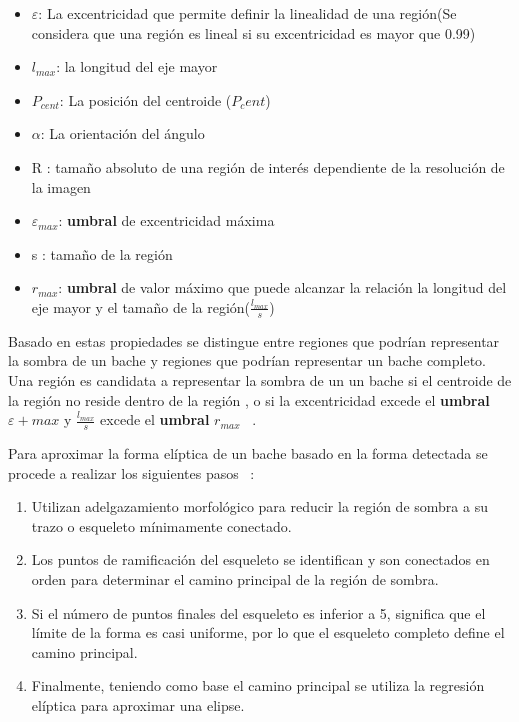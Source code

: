 	\begin{itemize}
		\item $\varepsilon$: La excentricidad que permite definir la linealidad de una región(Se considera que una región es lineal si su excentricidad
			es mayor que 0.99)
		\item $l_{max}$: la longitud del eje mayor 
		\item $P_{cent}$: La posición del centroide ($P_cent$)
		\item $\alpha$: La orientación del ángulo
		\item R : tamaño absoluto de una región de interés dependiente de la resolución de la imagen
		\item $\varepsilon_{max}$: \textbf{umbral} de excentricidad máxima
		\item s : tamaño de la región
		\item $r_{max}$: \textbf{umbral} de valor máximo que puede alcanzar la relación la longitud del eje mayor y el tamaño de la región($\frac{l_{max}
			}{s}$) \end{itemize} 

	Basado en estas propiedades se distingue entre regiones que podrían representar la sombra de un bache y regiones que podrían representar un bache
	completo. Una región es candidata a representar la sombra de un un bache si el centroide de la región no reside dentro de la región , o si la
	excentricidad excede el \textbf{umbral} $\varepsilon+{max}$ y $\frac{l_{max}}{s}$ excede el \textbf{umbral} $r_{max}$ ~.



	Para aproximar la forma elíptica de un bache basado en la forma detectada se procede a realizar los siguientes pasos ~:

	\begin{enumerate}
		\item Utilizan adelgazamiento morfológico para reducir la región de sombra  a su trazo o esqueleto mínimamente conectado.
		\item Los puntos de ramificación del esqueleto se identifican y son conectados en orden para determinar el camino principal de la región de sombra.
		\item Si el número de puntos finales del esqueleto es inferior a 5, significa que el límite de la forma es casi uniforme, por lo que el esqueleto
			completo define el camino principal.
		\item Finalmente, teniendo como base el camino principal se utiliza la regresión elíptica para aproximar una elipse.
	\end{enumerate}

